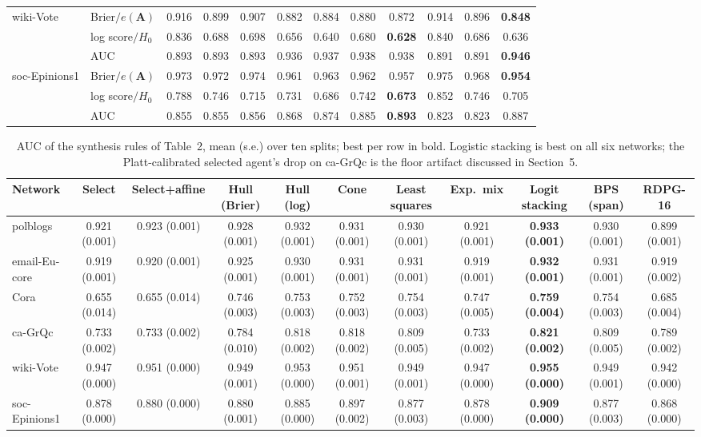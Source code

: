 \documentclass[12pt]{article}
\begin{document}
\begin{table}[ht]
\begin{tabular}{llcccccccccc}
wiki-Vote & Brier$/e(\mathbf{A})$ & 0.916 & 0.899 & 0.907 & 0.882 & 0.884 & 0.880 & 0.872 & 0.914 & 0.896 & \textbf{0.848} \\
 & log score$/H_0$ & 0.836 & 0.688 & 0.698 & 0.656 & 0.640 & 0.680 & \textbf{0.628} & 0.840 & 0.686 & 0.636 \\
 & AUC & 0.893 & 0.893 & 0.893 & 0.936 & 0.937 & 0.938 & 0.938 & 0.891 & 0.891 & \textbf{0.946} \\
soc-Epinions1 & Brier$/e(\mathbf{A})$ & 0.973 & 0.972 & 0.974 & 0.961 & 0.963 & 0.962 & 0.957 & 0.975 & 0.968 & \textbf{0.954} \\
 & log score$/H_0$ & 0.788 & 0.746 & 0.715 & 0.731 & 0.686 & 0.742 & \textbf{0.673} & 0.852 & 0.746 & 0.705 \\
 & AUC & 0.855 & 0.855 & 0.856 & 0.868 & 0.874 & 0.885 & \textbf{0.893} & 0.823 & 0.823 & 0.887 \\
\bottomrule
\end{tabular}

\end{table}

\begin{table}[t]
\centering
\caption{AUC of the synthesis rules of Table~2, mean (s.e.) over ten splits; best per row in bold. Logistic stacking is best on all six networks; the Platt-calibrated selected agent's drop on ca-GrQc is the floor artifact discussed in Section~5.}
\begin{tabular}{lcccccccccc}
\toprule
Network & Select & Select+affine & Hull (Brier) & Hull (log) & Cone & Least squares & Exp.\ mix & Logit stacking & BPS (span) & RDPG-16 \\
\midrule
polblogs & 0.921 (0.001) & 0.923 (0.001) & 0.928 (0.001) & 0.932 (0.001) & 0.931 (0.001) & 0.930 (0.001) & 0.921 (0.001) & \textbf{0.933 (0.001)} & 0.930 (0.001) & 0.899 (0.001) \\
email-Eu-core & 0.919 (0.001) & 0.920 (0.001) & 0.925 (0.001) & 0.930 (0.001) & 0.931 (0.001) & 0.931 (0.001) & 0.919 (0.001) & \textbf{0.932 (0.001)} & 0.931 (0.001) & 0.919 (0.002) \\
Cora & 0.655 (0.014) & 0.655 (0.014) & 0.746 (0.003) & 0.753 (0.003) & 0.752 (0.003) & 0.754 (0.003) & 0.747 (0.005) & \textbf{0.759 (0.004)} & 0.754 (0.003) & 0.685 (0.004) \\
ca-GrQc & 0.733 (0.002) & 0.733 (0.002) & 0.784 (0.010) & 0.818 (0.002) & 0.818 (0.002) & 0.809 (0.005) & 0.733 (0.002) & \textbf{0.821 (0.002)} & 0.809 (0.005) & 0.789 (0.002) \\
wiki-Vote & 0.947 (0.000) & 0.951 (0.000) & 0.949 (0.001) & 0.953 (0.000) & 0.951 (0.001) & 0.949 (0.001) & 0.947 (0.000) & \textbf{0.955 (0.000)} & 0.949 (0.001) & 0.942 (0.000) \\
soc-Epinions1 & 0.878 (0.000) & 0.880 (0.000) & 0.880 (0.001) & 0.885 (0.000) & 0.897 (0.002) & 0.877 (0.003) & 0.878 (0.000) & \textbf{0.909 (0.000)} & 0.877 (0.003) & 0.868 (0.000) \\
\bottomrule
\end{tabular}

\end{table}
\end{document}
